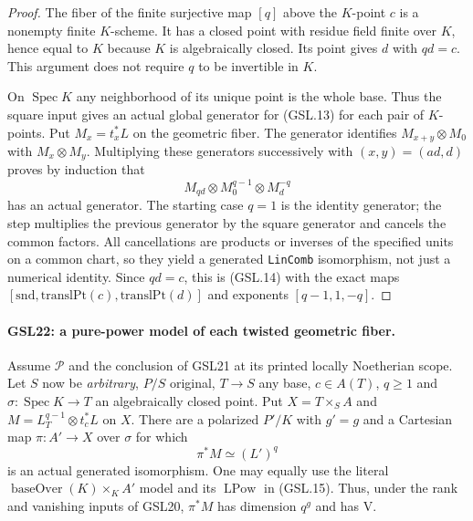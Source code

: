 \begin{proof}
The fiber of the finite surjective map $[q]$ above the $K$-point
$c$ is a nonempty finite $K$-scheme.  It has a closed point with
residue field finite over $K$, hence equal to $K$ because $K$ is
algebraically closed.  Its point gives $d$ with $qd=c$.  This
argument does not require $q$ to be invertible in $K$.

On $\operatorname{Spec}K$ any neighborhood of its unique point
is the whole base.  Thus the square input gives an actual
global generator for (GSL.13) for each pair of $K$-points.
Put $M_x=t_x^*L$ on the geometric fiber.  The generator
identifies $M_{x+y}\otimes M_0$ with $M_x\otimes M_y$.
Multiplying these generators successively with $(x,y)=(ad,d)$
proves by induction that
\[
 M_{qd}\otimes M_0^{q-1}\otimes M_d^{-q}
\]
has an actual generator.  The starting case $q=1$ is the
identity generator; the step multiplies the previous generator
by the square generator and cancels the common factors.
All cancellations are products or inverses of the specified
units on a common chart, so they yield a generated
\texttt{LinComb} isomorphism, not just a numerical identity.
Since $qd=c$, this is (GSL.14) with the exact maps
$[\mathrm{snd},\mathrm{translPt}(c),\mathrm{translPt}(d)]$
and exponents $[q-1,1,-q]$.
\end{proof}

\paragraph{GSL22: a pure-power model of each twisted geometric fiber.}
\label{claim:GSL22}
Assume $\mathcal P$ and the conclusion of GSL21 at its printed
locally Noetherian scope.  Let $S$ now be \emph{arbitrary},
$P/S$ original, $T\to S$ any base, $c\in A(T)$, $q\ge1$ and
$\sigma:\operatorname{Spec}K\to T$ an algebraically closed point.
Put $X=T\times_S A$ and
$M=L_T^{q-1}\otimes t_c^*L$ on $X$.  There are a polarized
$P'/K$ with $g'=g$ and a Cartesian map
$\pi:A'\to X$ over $\sigma$ for which
\[
 \pi^*M\simeq (L')^q \tag{GSL.15}
\]
is an actual generated isomorphism.  One may equally use the
literal $\operatorname{baseOver}(K)\times_K A'$ model and its
$\operatorname{LPow}$ in (GSL.15).  Thus, under the rank and
vanishing inputs of GSL20, $\pi^*M$ has dimension $q^g$ and
has $\mathrm V$.

